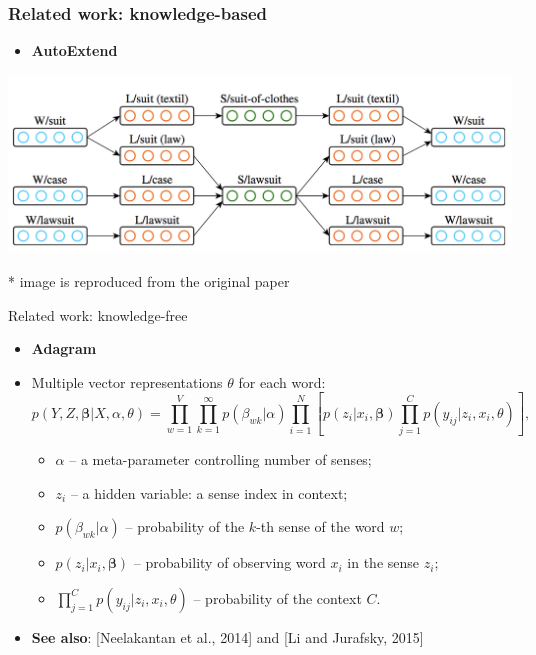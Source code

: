 \documentclass{beamer}
\begin{document}
\begin{frame}
\frametitle{Related work: knowledge-based}
\begin{itemize}
	\item \textbf{AutoExtend}~\cite{rothe-schutze:2015:ACL-IJCNLP}
\end{itemize}
\begin{center}
 \includegraphics[width=1.0\textwidth]{autoextend}
 \end{center}

{\footnotesize
 * image is reproduced from the original paper
}

\end{frame}

\begin{frame}{Related work: knowledge-free}

\begin{itemize}
\item \textbf{Adagram}~\cite{bartunov2016breaking}
\item Multiple vector representations $\theta$ for each word:
 $$p(Y,Z,\mathbf{\beta}|X,\alpha,\theta) = \prod_{w=1}^{V} \prod_{k=1}^{\infty} p(\beta_{wk}|\alpha) \prod_{i=1}^N [p(z_i|x_i,\mathbf{\beta}) \prod_{j=1}^C p(y_{ij}|z_i,x_i,\theta)],$$ 
\begin{itemize}
\item $\alpha$ -- a meta-parameter controlling number of senses;
\item $z_i$ -- a hidden variable: a sense index in context; 
\item $p(\beta_{wk}|\alpha)$ -- probability of the $k$-th sense of the word $w$;
\item $p(z_i|x_i,\mathbf{\beta})$ -- probability of observing word $x_i$ in the sense $z_i$;
\item $\prod_{j=1}^C p(y_{ij}|z_i,x_i,\theta)$ -- probability of the context $C$.
\end{itemize}

\pause 
\item \alert{\textbf{See also}}: [Neelakantan et al., 2014] and [Li and Jurafsky, 2015]

\end{itemize}
	
\end{frame}
\end{document}
